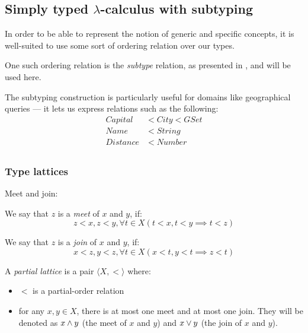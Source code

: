 \documentclass[main.tex]{subfiles}
\begin{document}
\subsection{Simply typed $\lambda$-calculus with subtyping}
\label{sec:lambda}

In order to be able to represent the notion of generic and specific concepts,
it is well-suited to use some sort of ordering relation over our types.

One such ordering relation is the \emph{subtype} relation, as presented in
\cite[chap.~15]{pierce}, and will be used here.

\begin{example}
    The subtyping construction is particularly useful for domains like
    geographical queries --- it lets us express relations such as the following:
    \begin{align*}
        Capital & \less City \less GSet \\
        Name & \less String \\
        Distance & \less Number \\
    \end{align*}
\end{example}

\subsubsection{Type lattices}
\begin{defn}
    Meet and join:

    We say that $z$ is a \emph{meet} of $x$ and $y$, if:
    \begin{equation}
        z \less x, z \less y,
            \forall t \in X (t \less x, t \less y \implies t \less z)
    \end{equation}

    We say that $z$ is a \emph{join} of $x$ and $y$, if:
    \begin{equation}
        x \less z, y \less z,
            \forall t \in X (x \less t, y \less t \implies z \less t)
    \end{equation}
\end{defn}

\begin{defn}
    A \emph{partial lattice} is a pair $\langle X, \less \rangle$ where:
    \begin{itemize}
        \item $\less$ is a partial-order relation
        \item for any $x, y \in X$, there is at most one meet and at most one join.
            They will be denoted as $x \wedge y$ (the meet of $x$ and $y$) and
            $x \vee y$ (the join of $x$ and $y$).
    \end{itemize}
\end{defn}
\end{document}
